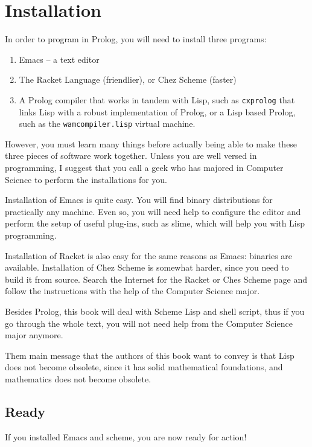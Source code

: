 \documentclass[a4paper,12pt]{book}
\begin{document}
\chapter{Installation}  
In order to program in Prolog, you will need
to install three programs:
\begin{enumerate}
	\item Emacs -- a text editor
	\item The Racket Language (friendlier), or Chez Scheme
		(faster) 
	\item A Prolog compiler that works in tandem with Lisp,
		such as \verb|cxprolog| that links Lisp with a robust
		implementation of Prolog, or a Lisp based Prolog, such
		as  the \verb|wamcompiler.lisp| virtual machine.
\end{enumerate}

However, you must learn many things before actually being
able to make these three pieces of software work together. 
Unless you are well versed in programming, I suggest that
you call a geek who has majored in Computer Science to perform
the installations for you.

Installation of Emacs is quite easy. You will find binary
distributions for practically any machine. Even so, you
will need help to configure the editor and perform the
setup of useful plug-ins, such as slime, which will help
you with Lisp programming.

Installation of Racket is also easy for the same reasons
as Emacs: binaries are available. Installation of Chez
Scheme is somewhat harder, since you need to build it
from source. Search the Internet for the Racket or Ches
Scheme page  and follow the instructions with the help
of the Computer Science major.

Besides Prolog, this book will deal with Scheme Lisp
and shell script, thus if you go through the whole
text, you will not need help from the Computer Science
major anymore.

Them main message that the authors of this book want to
convey is that Lisp does not become obsolete, since it
has solid mathematical foundations, and mathematics does
not become obsolete.

\section{Ready}
If you installed Emacs and scheme, you are now ready for
action!
\end{document}
